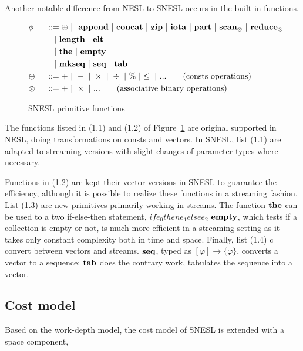 Another notable difference from NESL to SNESL occurs in the built-in functions. 

\begin{figure}[h]
\begin{alignat}{2} 
&\phi && ::= \oplus \ | \ \ \mathbf{append} \ | \ \mathbf{concat} \ | \ \mathbf{zip} \ | \ \mathbf{iota}  \ | \ \mathbf{part}  \ | \ \mathbf{scan}_{\otimes} \ | \ \mathbf{reduce}_{\otimes} \\
&   && \quad | \ \mathbf{length} \ | \ \mathbf{elt} \\
&   && \quad | \ \mathbf{the}  \ | \ \mathbf{empty} \\
&   && \quad | \ \mathbf{mkseq} \ | \ \mathbf{seq} \ | \ \mathbf{tab} \\
& \oplus  \ && :: = + \ | \ - \ | \ \times \ |  \  \div \ | \ \% \ | \le \ | \ ... \tag{consts operations} \\
& \otimes \ && :: = + \ | \ \times  \ | \ ...  \tag{associative binary operations}
\end{alignat}
\caption{SNESL primitive functions \label{fig-snesl-func}}
\end{figure}

The functions listed in (1.1) and (1.2) of Figure~\ref{fig-snesl-func} are original supported in NESL, doing transformations on consts and vectors. In SNESL, list (1.1) are adapted to streaming versions with slight changes of parameter types where necessary.

Functions in (1.2) are kept their vector versions in SNESL to guarantee the efficiency, although it is possible to realize these functions in a streaming fashion.
List (1.3) are new primitives primarily working in  streams.  
The function $\mathbf{the}$ can be used to a two if-else-then statement,  
$if e_0 then e_1 else e_2 $ 
$\mathbf{empty}$, which tests if a collection is empty or not, is much more efficient in a streaming setting as it takes only constant complexity both in time and space.  
Finally, list (1.4) c convert between vectors and streams. $\mathbf{seq}$, typed as $[\varphi] \rightarrow \{\varphi\}$, converts a vector to a sequence; $\mathbf{tab}$ does the contrary work, tabulates the sequence into a vector.



\subsection{Cost model}
Based on the work-depth model, the cost model of SNESL is extended with a space
component, 


